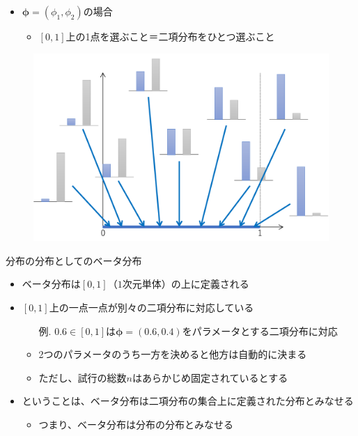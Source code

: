 \documentclass[aspectratio=169,unicode,dvipdfmx,14pt]{beamer}
\begin{document}
\begin{frame}
\begin{itemize}
\item $\bm{\phi}=(\phi_1,\phi_2)$の場合
\begin{itemize}
\item $[0,1]$上の1点を選ぶこと＝二項分布をひとつ選ぶこと
\end{itemize}
\end{itemize}
\begin{figure}[t]
\begin{center}
\vspace{-.3in}
\includegraphics[scale=0.15]{beta2.png}
\end{center}
\end{figure}
\end{frame}

\begin{frame}{分布の分布としてのベータ分布}
\begin{itemize}
\item ベータ分布は$[0,1]$（$1$次元単体）の上に定義される
\item $[0,1]$上の一点一点が別々の二項分布に対応している
\begin{itemize}
\item[例.] $0.6\in[0,1]$は$\bm{\phi}=(0.6,0.4)$をパラメータとする二項分布に対応
\item 2つのパラメータのうち一方を決めると他方は自動的に決まる
\item ただし、試行の総数$n$はあらかじめ固定されているとする
\end{itemize}
\item ということは、ベータ分布は二項分布の集合上に定義された分布とみなせる
\begin{itemize}
\item つまり、ベータ分布は分布の分布とみなせる
\end{itemize}
\end{itemize}
\end{frame}
\end{document}
